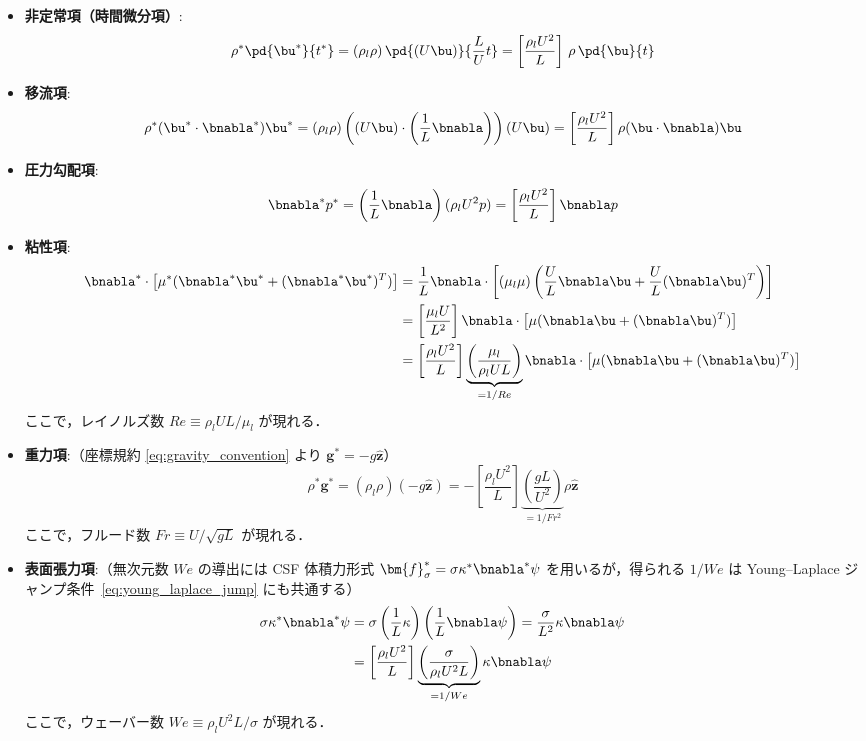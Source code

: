 \begin{itemize}
    \item \textbf{非定常項（時間微分項）}:
    \[
      \rho^* \pd{\bu^*}{t^*}
      = (\rho_l\rho)\,\pd{(U\bu)}{\frac{L}{U}t}
      = \left[\frac{\rho_l U^2}{L}\right]\,\rho\,\pd{\bu}{t}
    \]

    \item \textbf{移流項}:
    \[
      \rho^* (\bu^* \cdot \bnabla^*) \bu^*
      = (\rho_l\rho) \left( (U\bu) \cdot \left(\frac{1}{L}\bnabla\right) \right) (U\bu)
      = \left[\frac{\rho_l U^2}{L}\right] \rho(\bu\cdot\bnabla)\bu
    \]

    \item \textbf{圧力勾配項}:
    \[
      \bnabla^* p^* = \left(\frac{1}{L}\bnabla\right) (\rho_l U^2 p)
      = \left[\frac{\rho_l U^2}{L}\right] \bnabla p
    \]

    \item \textbf{粘性項}:
    \begin{align*}
     \bnabla^*\cdot\bigl[\mu^*(\bnabla^*\bu^* + (\bnabla^*\bu^*)^T)\bigr]
     &= \frac{1}{L}\bnabla\cdot\left[
         (\mu_l\mu)\left(\frac{U}{L}\bnabla\bu + \frac{U}{L}(\bnabla\bu)^T\right)
        \right] \\
     &= \left[\frac{\mu_l U}{L^2}\right]\bnabla\cdot\bigl[\mu(\bnabla\bu+(\bnabla\bu)^T)\bigr] \\
     &= \left[\frac{\rho_l U^2}{L}\right]
        \underbrace{\left(\frac{\mu_l}{\rho_l U L}\right)}_{=1/Re}
        \bnabla\cdot\bigl[\mu(\bnabla\bu+(\bnabla\bu)^T)\bigr]
    \end{align*}
    ここで，レイノルズ数 $Re \equiv \rho_l U L / \mu_l$ が現れる．

    \item \textbf{重力項}:（座標規約 \eqref{eq:gravity_convention} より $\bm{g}^* = -g\hat{\bm{z}}$）
    \[
      \rho^* \bm{g}^*
      = (\rho_l\rho) (-g\hat{\bm{z}})
      = -\left[\frac{\rho_l U^2}{L}\right]
        \underbrace{\left(\frac{gL}{U^2}\right)}_{=1/Fr^2}
        \rho \hat{\bm z}
    \]
    ここで，フルード数 $Fr \equiv U/\sqrt{gL}$ が現れる．

    \item \textbf{表面張力項}:（無次元数 $We$ の導出には CSF 体積力形式 $\bm{f}_\sigma^* = \sigma\kappa^*\bnabla^*\psi$ を用いるが，得られる $1/We$ は Young--Laplace ジャンプ条件~\eqref{eq:young_laplace_jump} にも共通する）
    \begin{align*}
      \sigma\kappa^*\bnabla^*\psi
      &= \sigma \left(\frac{1}{L}\kappa\right) \left(\frac{1}{L}\bnabla\psi\right)
       = \frac{\sigma}{L^2}\kappa\bnabla\psi \\
      &= \left[\frac{\rho_l U^2}{L}\right]
         \underbrace{\left(\frac{\sigma}{\rho_l U^2 L}\right)}_{=1/We}
         \kappa\bnabla\psi
    \end{align*}
    ここで，ウェーバー数 $We \equiv \rho_l U^2 L / \sigma$ が現れる．
\end{itemize}

